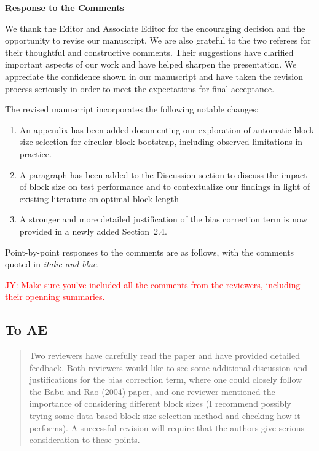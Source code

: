 \documentclass[12pt]{article}
\newcommand{\jy}[1]{\textcolor{red}{JY: #1}}
\newenvironment{comment}%
{\begin{quotation}\noindent\small\it\color{darkblue}\ignorespaces%
}{\end{quotation}}
\begin{document}
\begin{center}
  {\Large\bf Response to the Comments}
\end{center}


We thank the Editor and Associate Editor for the encouraging decision
and the opportunity to revise our manuscript. We are also grateful to
the two referees for their thoughtful and constructive comments. Their
suggestions have clarified important aspects of our work and have
helped sharpen the presentation. We appreciate the confidence shown in
our manuscript and have taken the revision process seriously in order
to meet the expectations for final acceptance.


The revised manuscript incorporates the following notable changes:
\begin{enumerate}
\item An appendix has been added documenting our exploration of
  automatic block size selection for circular block bootstrap,
  including observed limitations in practice.
\item  A paragraph has been added to the Discussion section to
  discuss the impact of block size on test performance and to
  contextualize our findings in light of existing literature on
  optimal block length
\item A stronger and more detailed justification of the bias
  correction term is now provided in a newly added Section~2.4.
\end{enumerate}


Point-by-point responses to the comments are as follows, with the
comments quoted in \emph{\color{darkblue} italic and blue}.

\jy{Make sure you've included all the comments from the reviewers,
  including their openning summaries.}

\subsection*{To AE}

\begin{comment}
Two reviewers have carefully read the paper and have provided detailed feedback.  Both reviewers would like to see some additional discussion and justifications for the bias correction term, where one could closely follow the Babu and Rao (2004) paper, and one reviewer mentioned the importance of considering different block sizes (I recommend possibly trying some data-based block size selection method and checking how it performs).  A successful revision will require that the authors give serious consideration to these points.
\end{comment}
\end{document}
